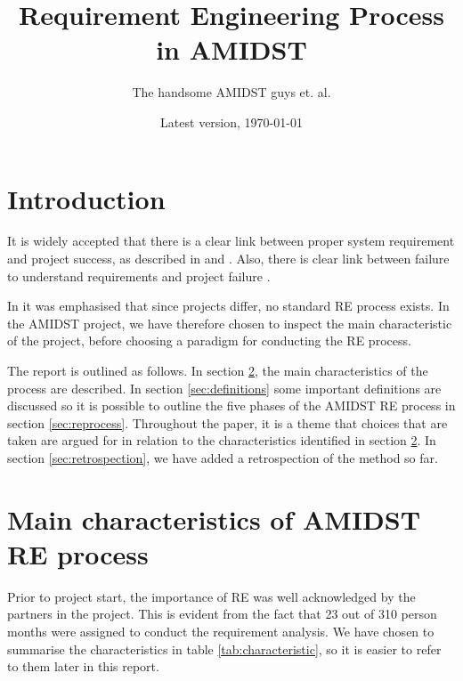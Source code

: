 \documentclass[11pt, oneside]{article}   	%
\title{Requirement Engineering Process in AMIDST}
\author{The handsome AMIDST guys et. al.}
\date{Latest version, \today}							%
\begin{document}
\maketitle
%
%
\section{Introduction}

It is widely accepted that there is a clear link between proper system requirement and project success, as described in  \cite{Boe91} and \cite{Jac99}.  Also, there is clear link between failure to understand requirements and project failure \cite{Ewu03}.  

In \cite{Ebe10} it was emphasised that since projects differ, no standard RE process exists.  In the AMIDST project, we have therefore chosen to inspect the main characteristic of the project, before choosing a paradigm for conducting the RE process.

The report is outlined as follows.  In section \ref{sec:characteristic}, the main characteristics of the process are described.  In section \ref{sec:definitions} some important definitions are discussed so it is possible to outline the five phases of the AMIDST RE process in section \ref{sec:reprocess}.  Throughout the paper, it is a theme that choices that are taken are argued for in relation to the characteristics identified in section \ref{sec:characteristic}.  In section \ref{sec:retrospection}, we have added a retrospection of the method so far.

\section{Main characteristics of AMIDST RE process}
\label{sec:characteristic}

Prior to project start, the importance of RE was well acknowledged by the partners in the project.  This is evident from the fact that 23 out of 310 person months were assigned to conduct the requirement analysis.  We have chosen to summarise the characteristics in table \ref{tab:characteristic}, so it is easier to refer to them later in this report.
\end{document}
